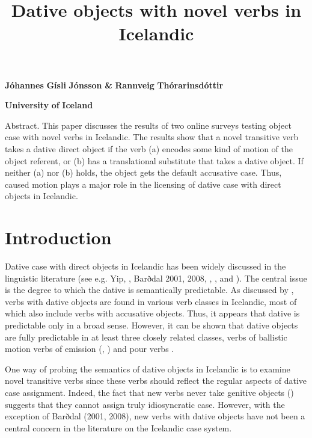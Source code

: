 \documentclass[output=paper,modfonts,nonflat]{langsci/langscibook}
\author{\affiliation{}\orcid{}}
\title{}
\begin{document}
\maketitle 

\title{Dative objects with novel verbs in Icelandic} 

\textbf{Jóhannes} \textbf{Gísli} \textbf{Jónsson} \textbf{\&} \textbf{Rannveig} \textbf{Thórarinsdóttir}

\textbf{University} \textbf{of} \textbf{Iceland}

\begin{stylelsAbstract}
Abstract. This paper discusses the results of two online surveys testing object case with novel verbs in Icelandic. The results show that a novel transitive verb takes a dative direct object if the verb (a) encodes some kind of motion of the object referent, or (b) has a translational substitute that takes a dative object. If neither (a) nor (b) holds, the object gets the default accusative case. Thus, caused motion plays a major role in the licensing of dative case with direct objects in Icelandic.
\end{stylelsAbstract}

\section{Introduction} %

Dative case with direct objects in Icelandic has been widely discussed in the linguistic literature (see e.g. Yip, \citealt{MalingJackendoff1987}, Barðdal 2001, 2008, \citealt{Svenonius2002}, \citealt{Maling2002}, and \citealt{Jónsson2013a}). The central issue is the degree to which the dative is semantically predictable. As discussed by \citet{Maling2002}, verbs with dative objects are found in various verb classes in Icelandic, most of which also include verbs with accusative objects. Thus, it appears that dative is predictable only in a broad sense. However, it can be shown that dative objects are fully predictable in at least three closely related classes, verbs of ballistic motion \citep{Svenonius2002} verbs of emission (\citealt{Maling2002}, \citealt{Jónsson2013a}) and pour verbs \citep{Jónsson2013a}.

One way of probing the semantics of dative objects in Icelandic is to examine novel transitive verbs since these verbs should reflect the regular aspects of dative case assignment. Indeed, the fact that new verbs never take genitive objects (\citealt{JónssonEythórsson2011}) suggests that they cannot assign truly idiosyncratic case. However, with the exception of Barðdal (2001, 2008), new verbs with dative objects have not been a central concern in the literature on the Icelandic case system. 
\end{document}
